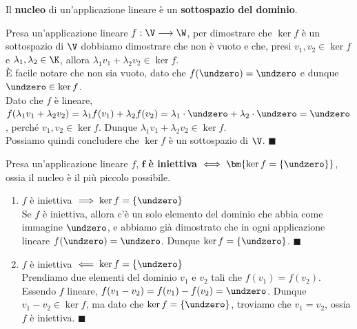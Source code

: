 \documentclass[11pt, a4paper, titlepage, oneside]{scrbook}
\begin{document}
\begin{Osservazione}[]
\label{oss-nucleo-sottospazio}
Il \textbf{nucleo} di un'applicazione lineare è un \textbf{sottospazio del dominio}.
\end{Osservazione}

\Dimostrazione \nopagebreak

Presa un'applicazione lineare $f: \V \longrightarrow \W$, per dimostrare che $\ker f$ è un sottospazio di $\V$ dobbiamo dimostrare che non è vuoto e che, presi $v_1, v_2 \in \ker f$ e $\lambda_1, \lambda_2 \in \K$, allora $\lambda_1 v_1 + \lambda_2 v_2 \in \ker f$. \\
È facile notare che non sia vuoto, dato che $f(\undzero) = \undzero$ e dunque $\undzero \in \ker f$. \\
Dato che $f$ è lineare, $f(\lambda_1 v_1 + \lambda_2 v_2) = \lambda_1 f(v_1) + \lambda_2 f(v_2) = \lambda_1 \cdot \undzero + \lambda_2 \cdot \undzero = \undzero$, perché $v_1, v_2 \in \ker f$. Dunque $\lambda_1 v_1 + \lambda_2 v_2 \in \ker f$.\\
Possiamo quindi concludere che $\ker f$ è un sottospazio di $\V$. $\blacksquare$ 

\begin{Proposizione}[]
\label{propos-applicazione-lineare-iniettiva-nucleo}
Presa un'applicazione lineare $f$, $\bm{f}$ \textbf{è iniettiva} $\iff \bm{\ker f = \{\undzero\}}$, ossia il nucleo è il più piccolo possibile. 
\end{Proposizione}

\vspace{2cm}

\Dimostrazione \nopagebreak

\begin{enumerate}[label=\arabic*°]
    \item $f$ è iniettiva $\implies \ker f = \{\undzero\}$ \\
    Se $f$ è iniettiva, allora c'è un solo elemento del dominio che abbia come immagine $\undzero$, e abbiamo già dimostrato che in ogni applicazione lineare $f(\undzero) = \undzero$. Dunque $\ker f = \{\undzero\}$. $\blacksquare$
    \item $f$ è iniettiva $\impliedby \ker f = \{\undzero\}$ \\
    Prendiamo due elementi del dominio $v_1$ e $v_2$ tali che $f(v_1) = f(v_2)$. Essendo $f$ lineare, $f(v_1 - v_2) = f(v_1) - f(v_2) = \undzero$. Dunque $v_1 - v_2 \in \ker f$, ma dato che $\ker f = \{\undzero\}$, troviamo che $v_1 = v_2$, ossia $f$ è iniettiva. $\blacksquare$
\end{enumerate}
\end{document}
